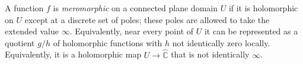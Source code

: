 
A function $f$ is \emph{meromorphic} on a connected plane domain $U$ if it is holomorphic on $U$ except at a discrete set of poles; these poles are allowed to take the extended value $\infty$. Equivalently, near every point of $U$ it can be represented as a quotient $g/h$ of holomorphic functions with $h$ not identically zero locally. Equivalently, it is a holomorphic map $U\to\widehat{\mathbb C}$ that is not identically $\infty$.

